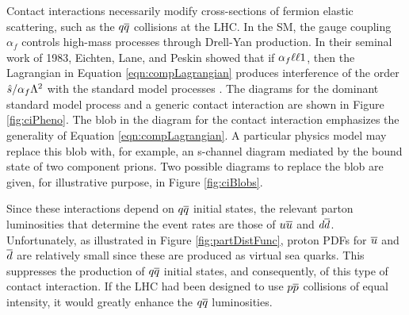 Contact interactions necessarily modify cross-sections of fermion elastic scattering, such as the $q\overline{q}$ collisions at the LHC.
In the SM, the gauge coupling $\alpha_f$ controls high-mass processes through Drell-Yan production.
In their seminal work of 1983, Eichten, Lane, and Peskin showed that if $\alpha_f\llt1$, then the Lagrangian in Equation \ref{eqn:compLagrangian} produces interference of the order $\hat{s}/\alpha_f\Lambda^2$ with the standard model processes \cite{eichten}.
The diagrams for the dominant standard model process and a generic contact interaction are shown in Figure \ref{fig:ciPheno}.
The blob in the diagram for the contact interaction emphasizes the generality of Equation \ref{eqn:compLagrangian}. A particular physics model may replace this blob with, for example, an s-channel diagram mediated by the bound state of two component prions.
Two possible diagrams to replace the blob are given, for illustrative purpose, in Figure \ref{fig:ciBlobs}.

Since these interactions depend on $q\overline{q}$ initial states, the relevant parton luminosities that determine the event rates are those of $u\overline{u}$ and $d\overline{d}$.
Unfortunately, as illustrated in Figure \ref{fig:partDistFunc}, proton PDFs for $\overline{u}$ and $\overline{d}$ are relatively small since these are produced as virtual sea quarks.
This suppresses the production of $q\overline{q}$ initial states, and consequently, of this type of contact interaction.
If the LHC had been designed to use $p\overline{p}$ collisions of equal intensity, it would greatly enhance the $q\overline{q}$ luminosities.


